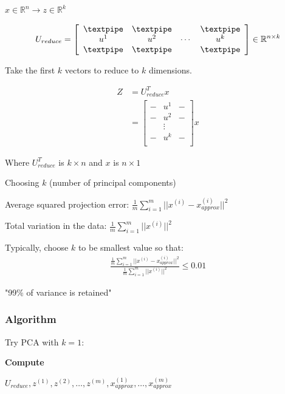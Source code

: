 \(x\in\mathbb{R}^n\rightarrow z\in\mathbb{R}^k\)

\begin{align*}
U_{reduce} = \left[
\begin{array}{cccc}
\textpipe & \textpipe & & \textpipe\\
u^1 & u^2 & \cdots & u^k\\
\textpipe & \textpipe & & \textpipe
\end{array}
\right]
\in \mathbb{R}^{n \times k}
\end{align*}

Take the first \(k\) vectors to reduce to \(k\) dimensions.

\begin{align*}
Z &= U_{reduce}^T x\\
  &= \left[
\begin{array}{cccc}
- & u^1 & -\\
- & u^2 & -\\
  & \vdots &   \\
- & u^k & - \\
\end{array}
\right]
x
\end{align*}

Where \(U_{reduce}^T\) is \(k \times n\) and \(x\) is \(n \times 1\)

Choosing \(k\) (number of principal components)

Average squared projection error:
\(\frac{1}{m} \sum^m_{i=1} ||x^{(i)} - x_{approx}^{(i)}||^2\)

Total variation in the data: \(\frac{1}{m} \sum^m_{i=1} ||x^{(i)}||^2\)

Typically, choose \(k\) to be smallest value so that: \begin{align*}
\frac
{\frac{1}{m} \sum^m_{i=1} ||x^{(i)} - x_{approx}^{(i)}||^2}
{\frac{1}{m} \sum^m_{i=1} ||x^{(i)}||^2} \leq 0.01
\end{align*}

"99\% of variance is retained"

\hypertarget{algorithm}{%
\subsubsection{Algorithm}\label{algorithm}}

Try PCA with \(k=1\):

\textbf{Compute}

\(U_{reduce},z^{(1)},z^{(2)},\dots,z^{(m)},x^{(1)}_{approx},\dots,x^{(m)}_{approx}\)


